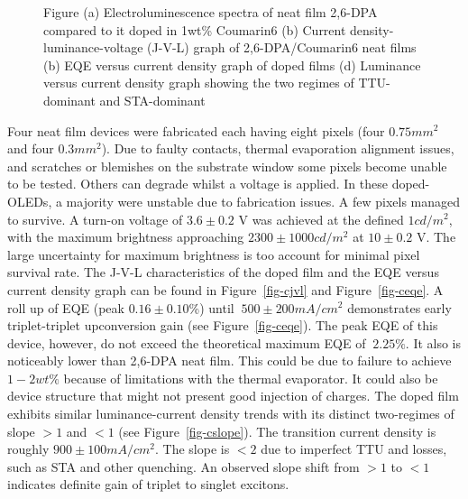 \documentclass[
  letterpaper,
  DIV=11,
  numbers=noendperiod,
  oneside]{scrreprt}
\begin{document}
\begin{figure}
\begin{minipage}[t]{0.50\linewidth}
{{}

}

\subcaption{\label{fig-cslope}}
\end{minipage}%

\caption{\label{fig-cstuff}Figure (a) Electroluminescence spectra of
neat film 2,6-DPA compared to it doped in {1wt\%} Coumarin6 (b) Current
density-luminance-voltage (J-V-L) graph of 2,6-DPA/Coumarin6 neat films
(b) EQE versus current density graph of doped films (d) Luminance versus
current density graph showing the two regimes of TTU-dominant and
STA-dominant}

\end{figure}

Four neat film devices were fabricated each having eight pixels (four
\(0.75mm^2\) and four \(0.3mm^2\)). Due to faulty contacts, thermal
evaporation alignment issues, and scratches or blemishes on the
substrate window some pixels become unable to be tested. Others can
degrade whilst a voltage is applied. In these doped-OLEDs, a majority
were unstable due to fabrication issues. A few pixels managed to
survive. A turn-on voltage of \(3.6\pm0.2\) V was achieved at the
defined \(1 cd/m^2\), with the maximum brightness approaching
\(2300\pm1000 cd/m^2\) at \(10\pm0.2\) V. The large uncertainty for
maximum brightness is too account for minimal pixel survival rate. The
J-V-L characteristics of the doped film and the EQE versus current
density graph can be found in Figure~\ref{fig-cjvl} and
Figure~\ref{fig-ceqe}. A roll up of EQE (peak \(0.16\pm0.10\)\%) until
\(~500\pm200 mA/cm^2\) demonstrates early triplet-triplet upconversion
gain (see Figure~\ref{fig-ceqe}). The peak EQE of this device, however,
do not exceed the theoretical maximum EQE of \(~2.25\%\). It also is
noticeably lower than 2,6-DPA neat film. This could be due to failure to
achieve \(1-2wt\%\) because of limitations with the thermal evaporator.
It could also be device structure that might not present good injection
of charges. The doped film exhibits similar luminance-current density
trends with its distinct two-regimes of slope \(>1\) and \(<1\) (see
Figure~\ref{fig-cslope}). The transition current density is roughly
\(900\pm100 mA/cm^2\). The slope is \(<2\) due to imperfect TTU and
losses, such as STA and other quenching. An observed slope shift from
\(>1\) to \(<1\) indicates definite gain of triplet to singlet excitons.
\end{document}
